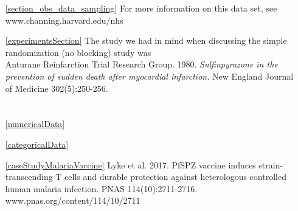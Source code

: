 {\begin{itemize}
	\item[\ref{section_obs_data_sampling}]
	For more information on this data set, see \\
	{www.channing.harvard.edu/nhs}

	\item[\ref{experimentsSection}]
	The study we had in mind when discussing the
	simple randomization (no blocking) study was \\
	Anturane Reinfarction Trial Research Group. 1980.
	\emph{Sulfinpyrazone in the prevention of sudden
		death after myocardial infarction.}
	New England Journal of Medicine 302(5):250-256.
\end{itemize}
}



\section{}
\label{ch_summarizing_data_data}


\begin{itemize}
\setlength{\itemsep}{0mm}
\item[\ref{numericalData}]

\item[\ref{categoricalData}]

\item[\ref{caseStudyMalariaVaccine}]
    Lyke et al. 2017.
    PfSPZ vaccine induces strain-transcending T cells
    and durable protection against heterologous controlled
    human malaria infection.
    PNAS 114(10):2711-2716.
        {www.pnas.org/content/114/10/2711}
\end{itemize}









\section{}
\label{ch_probability_data}

